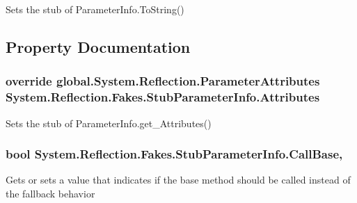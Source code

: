Sets the stub of Parameter\-Info.\-To\-String()



\subsection{Property Documentation}
\hypertarget{class_system_1_1_reflection_1_1_fakes_1_1_stub_parameter_info_a2cb7e25b330b5f38ce1b8170117b95a4}{
\subsubsection[{Attributes}]{\setlength{\rightskip}{0pt plus 5cm}override global.\-System.\-Reflection.\-Parameter\-Attributes System.\-Reflection.\-Fakes.\-Stub\-Parameter\-Info.\-Attributes\hspace{0.3cm}{\ttfamily [get]}}}\label{class_system_1_1_reflection_1_1_fakes_1_1_stub_parameter_info_a2cb7e25b330b5f38ce1b8170117b95a4}


Sets the stub of Parameter\-Info.\-get\-\_\-\-Attributes()

\hypertarget{class_system_1_1_reflection_1_1_fakes_1_1_stub_parameter_info_a9274f2a17e00e2f84533fd40627ac300}{
\subsubsection[{Call\-Base}]{\setlength{\rightskip}{0pt plus 5cm}bool System.\-Reflection.\-Fakes.\-Stub\-Parameter\-Info.\-Call\-Base\hspace{0.3cm}{\ttfamily [get]}, {\ttfamily [set]}}}\label{class_system_1_1_reflection_1_1_fakes_1_1_stub_parameter_info_a9274f2a17e00e2f84533fd40627ac300}


Gets or sets a value that indicates if the base method should be called instead of the fallback behavior


